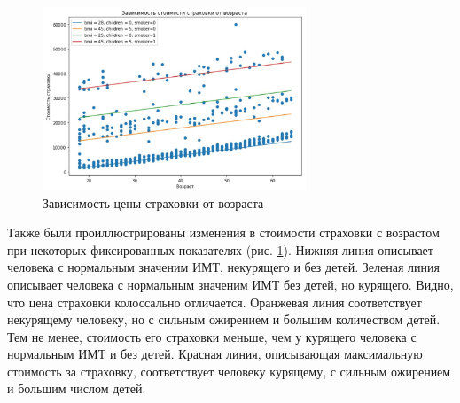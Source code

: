 \documentclass[a4paper,12pt]{article}
\begin{document}
\begin{figure}[H]
	\includegraphics[width=0.7\textwidth]{../[graphics]/example.jpg}
	\centering
	\caption{Зависимость цены страховки от возраста}
	\label{fig:example}
\end{figure}

Также были проиллюстрированы изменения в стоимости страховки с возрастом при некоторых фиксированных показателях (рис. \ref{fig:example}). Нижняя линия описывает человека с нормальным значеним ИМТ, некурящего и без детей. Зеленая линия описывает человека с нормальным значеним ИМТ без детей, но курящего. Видно, что цена страховки колоссально отличается. Оранжевая линия соответствует некурящему человеку, но с сильным ожирением и большим количеством детей. Тем не менее, стоимость его страховки меньше, чем у курящего человека с нормальным ИМТ и без детей. Красная линия, описывающая максимальную стоимость за страховку, соответствует человеку курящему, с сильным ожирением и большим числом детей.
\end{document}
